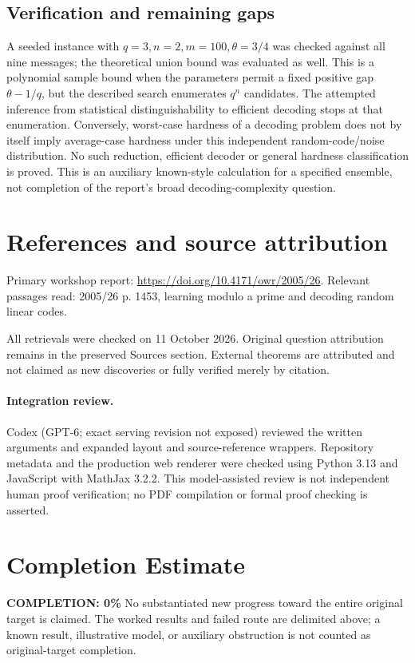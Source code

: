 \documentclass[11pt]{article}
\begin{document}
\subsection{Verification and remaining gaps}
A seeded instance with $q=3,n=2,m=100,\theta=3/4$ was checked against all nine messages; the theoretical union bound was evaluated as well. This is a polynomial sample bound when the parameters permit a fixed positive gap $\theta-1/q$, but the described search enumerates $q^n$ candidates. The attempted inference from statistical distinguishability to efficient decoding stops at that enumeration. Conversely, worst-case hardness of a decoding problem does not by itself imply average-case hardness under this independent random-code/noise distribution. No such reduction, efficient decoder or general hardness classification is proved. This is an auxiliary known-style calculation for a specified ensemble, not completion of the report's broad decoding-complexity question.

\section{References and source attribution}
Primary workshop report: \url{https://doi.org/10.4171/owr/2005/26}. Relevant passages read: 2005/26 p. 1453, learning modulo a prime and decoding random linear codes.

All retrievals were checked on 11 October 2026. Original question attribution remains in the preserved Sources section. External theorems are attributed and not claimed as new discoveries or fully verified merely by citation.


\paragraph{Integration review.} Codex (GPT-6; exact serving revision not exposed) reviewed the written arguments and expanded layout and source-reference wrappers. Repository metadata and the production web renderer were checked using Python 3.13 and JavaScript with MathJax 3.2.2. This model-assisted review is not independent human proof verification; no PDF compilation or formal proof checking is asserted.

\section{Completion Estimate}
\noindent\textbf{COMPLETION: 0\%}
No substantiated new progress toward the entire original target is claimed. The worked results and failed route are delimited above; a known result, illustrative model, or auxiliary obstruction is not counted as original-target completion.
\end{document}

